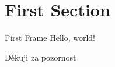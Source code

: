 \documentclass[14pt]{beamer}
\title{\makebox[\linewidth]{Robotika jednoduše}}
\date{\today}
\author{Tomáš Sláma}
\institute{Gymnázium Turnov}
\begin{document}
  \maketitle

  \section{First Section}

  \begin{frame}{First Frame}
    Hello, world!
  \end{frame}

  \appendix

  \begin{frame}[standout]
    Děkuji za pozornost
  \end{frame}
\end{document}
